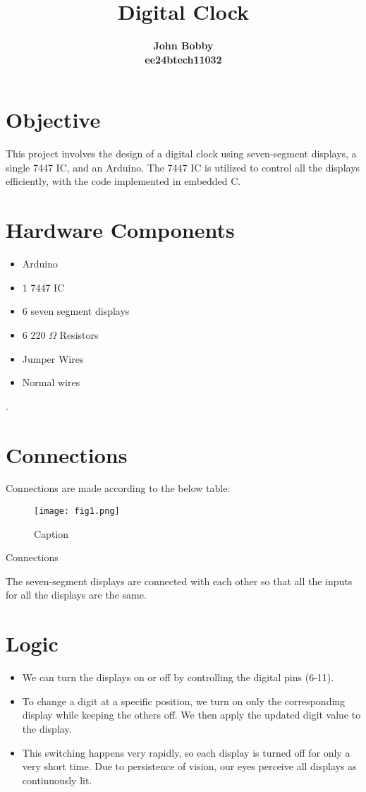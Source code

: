 \documentclass[12pt]{article}
\title{\textbf{Digital Clock}}
\author{\textbf{John Bobby}\\ \textbf{ee24btech11032}}
\date{}
\begin{document}
\maketitle

\section{Objective}
This project involves the design of a digital clock using seven-segment displays, a single 7447 IC, and an Arduino. The 7447 IC is utilized to control all the displays efficiently, with the code implemented in embedded C.

\section{Hardware Components}
\begin{itemize}
    \item Arduino
    \item 1 7447 IC
    \item 6 seven segment displays
    \item 6 220 $\Omega$ Resistors
    \item Jumper Wires
    \item Normal wires
\end{itemize}
.
\section{Connections}
Connections are made according to the below table:
\begin{figure}
    \centering
    \texttt{[image: fig1.png]}
    \caption{Caption}
    \label{fig:enter-label}
\end{figure}
\begin{table}[H]
    \centering
    
    \caption{Connections}
    \label{tab:my_label}
\end{table}
The seven-segment displays are  connected with each other so that all the inputs for all the displays are the same.
\section{Logic}
\begin{itemize}
    \item We can turn the displays on or off by controlling the digital pins (6-11).
    \item To change a digit at a specific position, we turn on only the corresponding display while keeping the others off. We then apply the updated digit value to the display.
    \item This switching happens very rapidly, so each display is turned off for only a very short time. Due to persistence of vision, our eyes perceive all displays as continuously lit.
\end{itemize}
\end{document}
